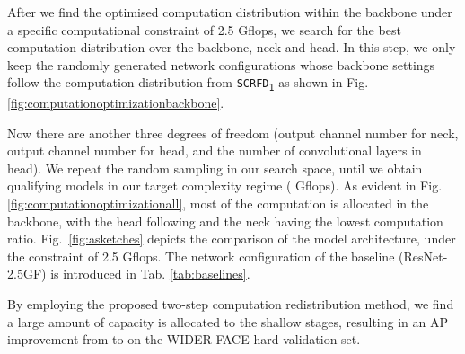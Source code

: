 \documentclass[10pt,twocolumn,letterpaper]{article}
\newcommand{\dsname}[1]{\texttt{\small #1}\xspace}
\newcommand{\scrfdv}[1]{\dsname{SCRFD\textsubscript{#1}}}
\newcommand{\scrfdf}[1]{\dsname{SCRFD-\text{#1}GF}}
\begin{document}
\begin{figure*}[h]
\footnotesize
\centering
{}
\caption{Computation redistribution and architecture sketches under the constraint of 2.5 Gflops. The computation distribution of \scrfdf{2.5} within backbone follows Fig. \ref{fig:computationoptimizationbackbone}. Please refer to Tab. \ref{tab:baselines} for the network configuration of ResNet-2.5GF. In (d), the yellow rectangles in C2 to C5 represents the basic residual block. The width of rectangles corresponds to the computation cost. After computation redistribution, more computations are allocated to shallow stages (\ie C2 and C3).}
\label{fig:computationoptimizationall}
\end{figure*}

After we find the optimised computation distribution within the backbone under a specific computational constraint of 2.5 Gflops, we search for the best computation distribution over the backbone, neck and head. In this step, we only keep the randomly generated network configurations whose backbone settings follow the computation distribution from \scrfdv{1} as shown in Fig. \ref{fig:computationoptimizationbackbone}. 

Now there are another three degrees of freedom (\ie output channel number  for neck, output channel number  for head, and the number of  convolutional layers  in head). We repeat the random sampling in our search space, until we obtain  qualifying models in our target complexity regime ( Gflops). As evident in Fig. \ref{fig:computationoptimizationall}, most of the computation is allocated in the backbone, with the head following and the neck having the lowest computation ratio. Fig.~\ref{fig:asketches} depicts the comparison of the model architecture, under the constraint of 2.5 Gflops. 
The network configuration of the baseline (ResNet-2.5GF) is introduced in Tab. \ref{tab:baselines}.

By employing the proposed two-step computation redistribution method, we find a large amount of capacity is allocated to the shallow stages, resulting in an AP improvement from  to  on the WIDER FACE hard validation set.
\end{document}
